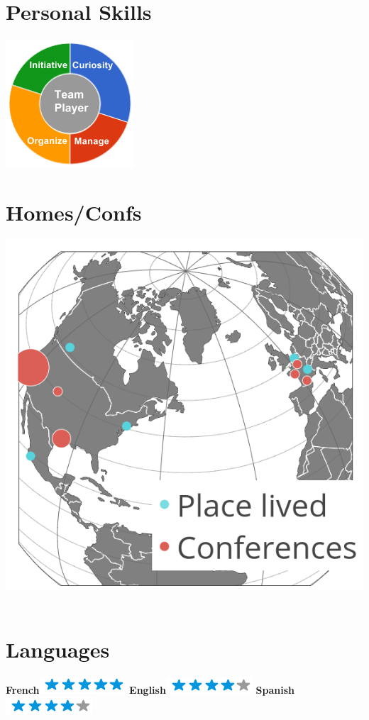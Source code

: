 \documentclass[]{friggeri-cv}
\begin{document}
\begin{aside}
~
~
~
  \section{Personal Skills}
    \includegraphics[scale=0.62]{img/personal.png}
    ~
  \section{Homes/Confs}
    \includegraphics[scale=0.2]{img/map.png}
    ~
  \section{Languages}
    \textbf{French}\includegraphics[scale=0.40]{img/5stars.png}
    \textbf{English}\includegraphics[scale=0.40]{img/4stars.png}
    \textbf{Spanish}\includegraphics[scale=0.40]{img/4stars.png}
\end{aside}
\end{document}
